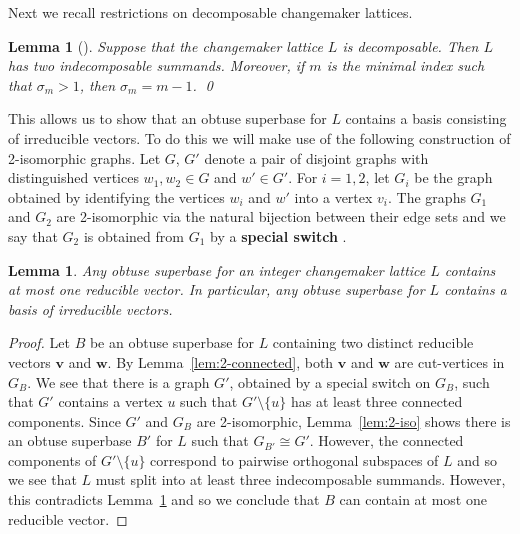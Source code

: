 \documentclass{amsart} %
\theoremstyle{thm}
\newtheorem{lem}[Theorem]{Lemma}
\theoremstyle{definition}
\numberwithin{equation}{section}
\begin{document}
Next we recall restrictions on decomposable changemaker lattices.
\begin{lem}[{\cite[Lemma~5.1]{GreeneLRP}}]\label{lem:decomposable_properties}
Suppose that the changemaker lattice $L$ is decomposable. Then $L$ has two indecomposable summands. Moreover, if $m$ is the minimal index such that $\sigma_m>1$, then $\sigma_m = m-1$. \qed
\end{lem}
This allows us to show that an obtuse superbase for $L$ contains a basis consisting of irreducible vectors.
To do this we will make use of the following construction of 2-isomorphic graphs. Let $G$, $G'$ denote a pair of disjoint graphs with distinguished vertices $w_1,w_2\in G$ and $w'\in G'$. For $i=1,2$, let $G_i$ be the graph obtained by identifying the vertices $w_i$ and $w'$ into a vertex $v_i$. The graphs $G_1$ and $G_2$ are 2-isomorphic via the natural bijection between their edge sets and we say that $G_2$ is obtained from $G_1$ by a \textbf{special switch} \cite[\S3.4]{Gr13}.
\begin{lem}\label{lem:one_reducible}
Any obtuse superbase for an integer changemaker lattice $L$ contains at most one reducible vector. In particular, any obtuse superbase for $L$ contains a basis of irreducible vectors.
\end{lem}
\begin{proof}
Let $B$ be an obtuse superbase for $L$ containing two distinct reducible vectors $\bm{v}$ and $\bm{w}$. By Lemma~\ref{lem:2-connected}, both $\bm{v}$ and $\bm{w}$ are cut-vertices in $G_B$. We see that there is a graph $G'$, obtained by a special switch on $G_B$, such that $G'$ contains a vertex $u$ such that $G'\setminus\{u\}$ has at least three connected components. Since $G'$ and $G_B$ are 2-isomorphic, Lemma~\ref{lem:2-iso} shows there is an obtuse superbase $B'$ for $L$ such that $G_{B'}\cong G'$. However, the connected components of $G'\setminus\{u\}$ correspond to pairwise orthogonal subspaces of $L$ and so we see that $L$ must split into at least three indecomposable summands. However, this contradicts Lemma~\ref{lem:decomposable_properties} and so we conclude that $B$ can contain at most one reducible vector.
\end{proof}
\end{document}
